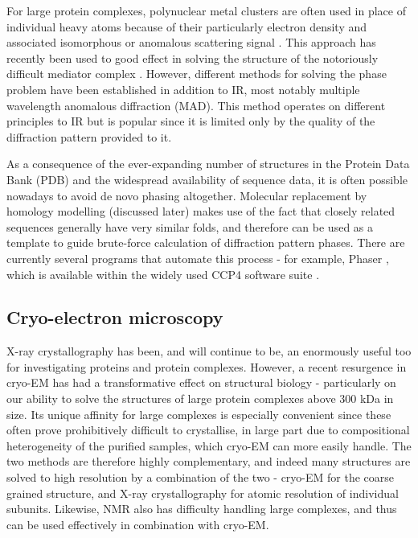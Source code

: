\documentclass[a4paper,11pt,twoside,openright]{scrbook}
\begin{document}
For large protein complexes, polynuclear metal clusters are often used in place of individual heavy atoms because of their particularly electron density and associated isomorphous or anomalous scattering signal \cite{Dauter2005}. This approach has recently been used to good effect in solving the structure of the notoriously difficult mediator complex \cite{Nozawa2017}. However, different methods for solving the phase problem have been established in addition to IR, most notably multiple wavelength anomalous diffraction \cite{Hendrickson1991} (MAD). This method operates on different principles to IR but is popular since it is limited only by the quality of the diffraction pattern provided to it.

As a consequence of the ever-expanding number of structures in the Protein Data Bank \cite{Berman2000} (PDB) and the widespread availability of sequence data, it is often possible nowadays to avoid de novo phasing altogether. Molecular replacement by homology modelling (discussed later) makes use of the fact that closely related sequences generally have very similar folds, and therefore can be used as a template to guide brute-force calculation of diffraction pattern phases. There are currently several programs that automate this process - for example, Phaser \cite{McCoy2007}, which is available within the widely used CCP4 software suite \cite{Winn2011a}.

\subsection{Cryo-electron microscopy}
X-ray crystallography has been, and will continue to be, an enormously useful too for investigating proteins and protein complexes. However, a recent resurgence in cryo-EM has had a transformative effect on structural biology - particularly on our ability to solve the structures of large protein complexes above 300 kDa in size. Its unique affinity for large complexes is especially convenient since these often prove prohibitively difficult to crystallise, in large part due to compositional heterogeneity of the purified samples, which cryo-EM can more easily handle. The two methods are therefore highly complementary, and indeed many structures are solved to high resolution by a combination of the two - cryo-EM for the coarse grained structure, and X-ray crystallography for atomic resolution of individual subunits. Likewise, NMR also has difficulty handling large complexes, and thus can be used effectively in combination with cryo-EM.
\end{document}

